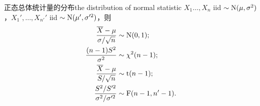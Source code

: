 \begin{theorem}{正态总体统计量的分布}{the distribution of normal statistic}
	$X_1\ldots,X_n$ iid $\sim\operatorname{N}(\mu,\sigma^2)$，$X_1',\ldots,X_{n'}'$ iid $\sim\operatorname{N}(\mu',\sigma'^2)$，则
	\begin{subequations}
		\begin{align}
			\label{sample-N}
			\frac{\overline{X}-\mu}{\sigma/\sqrt n}&\sim\operatorname{N}(0,1);\\
			\label{sample-chi2}
			\frac{(n-1)S^2}{\sigma^2}&\sim\chi^2(n-1);\\
			\label{sample-t}
			\frac{\overline{X}-\mu}{S/\sqrt n}&\sim\mathrm t(n-1);\\
			\label{2sample-F}
			\frac{S^2/S'^2}{\sigma^2/\sigma'^2}&\sim\mathrm F(n-1,n'-1).
		\end{align}
	\end{subequations}
\end{theorem}
